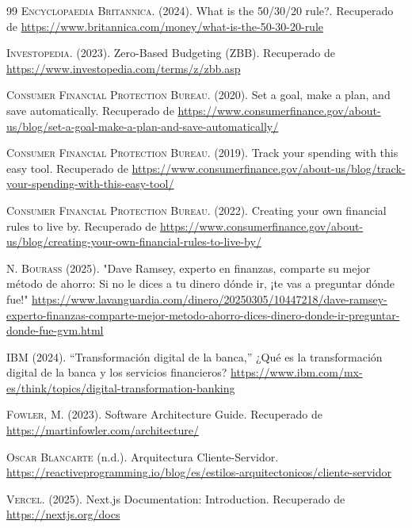 \begin{thebibliography}{99}
\textsc{Encyclopaedia Britannica.} (2024). What is the 50/30/20 rule?. Recuperado de \url{https://www.britannica.com/money/what-is-the-50-30-20-rule}

\textsc{Investopedia.} (2023). Zero-Based Budgeting (ZBB). Recuperado de \url{https://www.investopedia.com/terms/z/zbb.asp}

\textsc{Consumer Financial Protection Bureau.} (2020). Set a goal, make a plan, and save automatically. Recuperado de \url{https://www.consumerfinance.gov/about-us/blog/set-a-goal-make-a-plan-and-save-automatically/}

\textsc{Consumer Financial Protection Bureau.} (2019). Track your spending with this easy tool. Recuperado de \url{https://www.consumerfinance.gov/about-us/blog/track-your-spending-with-this-easy-tool/}

\textsc{Consumer Financial Protection Bureau.} (2022). Creating your own financial rules to live by. Recuperado de \url{https://www.consumerfinance.gov/about-us/blog/creating-your-own-financial-rules-to-live-by/}

\textsc{N. Bourass} (2025). "Dave Ramsey, experto en finanzas, comparte su mejor método de ahorro: Si no le dices a tu dinero dónde ir, ¡te vas a preguntar dónde fue!"
\url{https://www.lavanguardia.com/dinero/20250305/10447218/dave-ramsey-experto-finanzas-comparte-mejor-metodo-ahorro-dices-dinero-donde-ir-preguntar-donde-fue-gvm.html}

\textsc{IBM} (2024). “Transformación digital de la banca,” ¿Qué es la transformación digital de la banca y los servicios financieros?
\url{https://www.ibm.com/mx-es/think/topics/digital-transformation-banking}


\textsc{Fowler, M.} (2023). Software Architecture Guide. Recuperado de \url{https://martinfowler.com/architecture/}

\textsc{Oscar  Blancarte} (n.d.). Arquitectura Cliente-Servidor.
\url{https://reactiveprogramming.io/blog/es/estilos-arquitectonicos/cliente-servidor}

\textsc{Vercel.} (2025). Next.js Documentation: Introduction. Recuperado de \url{https://nextjs.org/docs}


\end{thebibliography}
